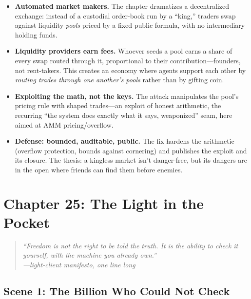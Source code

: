\documentclass[12pt,letterpaper]{book}
\providecommand{\tightlist}{\setlength{\itemsep}{0pt}\setlength{\parskip}{0pt}}
\begin{document}
\begin{itemize}
\tightlist
\item
  \textbf{Automated market makers.} The chapter dramatizes a decentralized
  exchange: instead of a custodial order-book run by a ``king,'' traders swap
  against liquidity \emph{pools} priced by a fixed public formula, with no
  intermediary holding funds.
\item
  \textbf{Liquidity providers earn fees.} Whoever seeds a pool earns a share of
  every swap routed through it, proportional to their contribution---founders, not
  rent-takers. This creates an economy where agents support each other by
  \emph{routing trades through one another's pools} rather than by gifting coin.
\item
  \textbf{Exploiting the math, not the keys.} The attack manipulates the pool's
  pricing rule with shaped trades---an exploit of honest arithmetic, the recurring
  ``the system does exactly what it says, weaponized'' seam, here aimed at AMM
  pricing/overflow.
\item
  \textbf{Defense: bounded, auditable, public.} The fix hardens the arithmetic
  (overflow protection, bounds against cornering) and publishes the exploit and its
  closure. The thesis: a kingless market isn't danger-free, but its dangers are in
  the open where friends can find them before enemies.
\end{itemize}


\hypertarget{chapter-25-the-light-in-the-pocket}{%
\section{Chapter 25: The Light in the
Pocket}\label{chapter-25-the-light-in-the-pocket}}

\begin{quote}
\itshape ``Freedom is not the right to be told the truth. It is the ability to
check it yourself, with the machine you already own.''\\
\normalfont\hfill---light-client manifesto, one line long
\end{quote}

\hypertarget{scene-1-the-billion-who-could-not-check}{%
\subsection{Scene 1: The Billion Who Could Not
Check}\label{scene-1-the-billion-who-could-not-check}}
\end{document}
